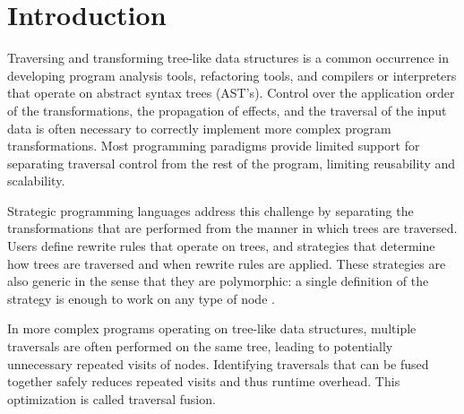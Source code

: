 

\chapter{Introduction}
\label{chap:introduction}
Traversing and transforming tree-like data structures is a common occurrence in developing program analysis tools, refactoring tools, and compilers or interpreters that operate on abstract syntax trees (AST's). Control over the application order of the transformations, the propagation of effects, and the traversal of the input data is often necessary to correctly implement more complex program transformations\autocite{LaemmelVV02}. Most programming paradigms provide limited support for separating traversal control from the rest of the program, limiting reusability and scalability\autocite{LaemmelVV02}.

Strategic programming languages address this challenge by separating the transformations that are performed from the manner in which trees are traversed. Users define rewrite rules that operate on trees, and strategies that determine how trees are traversed and when rewrite rules are applied. These strategies are also generic in the sense that they are polymorphic: a single definition of the strategy is enough to work on any type of node \autocite{LaemmelVV02, Visser01}.

In more complex programs operating on tree-like data structures, multiple traversals are often performed on the same tree, leading to potentially unnecessary repeated visits of nodes. Identifying traversals that can be fused together safely reduces repeated visits and thus runtime overhead. This optimization is called traversal fusion.

